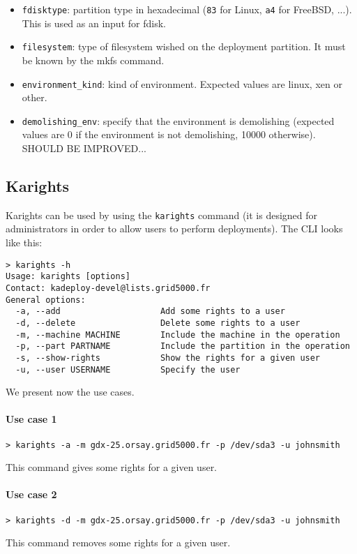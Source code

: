 \documentclass[a4wide,10pt,oneside]{book}
\begin{document}
\begin{itemize}
\item \texttt{fdisktype}: partition type in hexadecimal (\texttt{83} for Linux, \texttt{a4} for FreeBSD, ...). This is used as an input for fdisk.
\item \texttt{filesystem}: type of filesystem wished on the deployment partition. It must be known by the mkfs command.
\item \texttt{environment\_kind}: kind of environment. Expected values are linux, xen or other.
\item \texttt{demolishing\_env}: specify that the environment is demolishing (expected values are 0 if the environment is not demolishing, 10000 otherwise). SHOULD BE IMPROVED...
\end{itemize}

\subsection{Karights}\label{sec:karights}
Karights can be used by using the \texttt{karights} command (it is designed for administrators in order to allow users to perform deployments). The CLI looks like this:
\begin{small}
\begin{verbatim}
> karights -h
Usage: karights [options]
Contact: kadeploy-devel@lists.grid5000.fr
General options:
  -a, --add                    Add some rights to a user
  -d, --delete                 Delete some rights to a user
  -m, --machine MACHINE        Include the machine in the operation
  -p, --part PARTNAME          Include the partition in the operation
  -s, --show-rights            Show the rights for a given user
  -u, --user USERNAME          Specify the user
\end{verbatim}
\end{small}

We present now the use cases.
\paragraph{Use case 1}
\begin{verbatim}
> karights -a -m gdx-25.orsay.grid5000.fr -p /dev/sda3 -u johnsmith
\end{verbatim}
This command gives some rights for a given user.

\paragraph{Use case 2}
\begin{verbatim}
> karights -d -m gdx-25.orsay.grid5000.fr -p /dev/sda3 -u johnsmith
\end{verbatim}
This command removes some rights for a given user.
\end{document}
